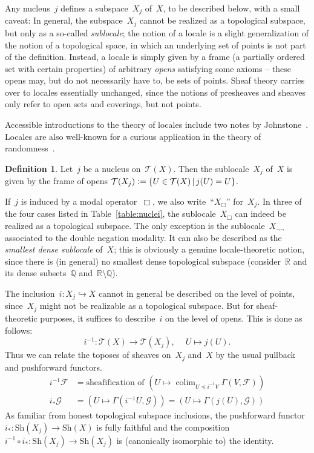 \documentclass[10pt,reqno,a4paper]{amsbook}
\theoremstyle{definition}
\newtheorem{defn}{Definition}[section]
\theoremstyle{plain}
\theoremstyle{remark}
\newcommand{\F}{\mathcal{F}}
\newcommand{\G}{\mathcal{G}}
\newcommand{\T}{\mathcal{T}}
\newcommand{\RR}{\mathbb{R}}
\newcommand{\QQ}{\mathbb{Q}}
\newcommand{\Sh}{\mathrm{Sh}}
\DeclareMathOperator*{\colim}{colim}
\newcommand{\Open}{\T}
\newcommand{\?}{\,{:}\,}
\renewcommand{\_}{\mathpunct{.}\,}
\newcommand{\lra}{\longrightarrow}
\newcommand{\defeq}{\vcentcolon=}
\begin{document}
Any nucleus~$j$ defines a subspace~$X_j$ of~$X$, to be described below, with a small caveat: In
general, the subspace~$X_j$ cannot be realized as a topological subspace, but
only as a so-called \emph{sublocale}; the notion of a locale is a slight
generalization of the notion of a topological space, in which an underlying set
of points is not part of the definition. Instead, a locale is simply given by a
frame (a partially ordered set with certain properties) of arbitrary \emph{opens} satisfying some axioms -- these opens may, but do not necessarily have to,
be sets of points. Sheaf theory carries over to locales essentially unchanged,
since the notions of presheaves and sheaves only refer to open sets and coverings,
but not points.

Accessible introductions to the theory of locales include two notes by
Johnstone~\cite{johnstone:art,johnstone:point}. Locales are also well-known for
a curious application in the theory of
randomness~\cite{simpson:random1,simpson:random2}.

\begin{defn}\label{defn:subspace-by-nucleus}Let~$j$ be a nucleus on~$\Open(X)$.
Then the sublocale~$X_j$ of~$X$ is given by the frame of opens
$\Open(X_j) \defeq \{ U \in \Open(X) \,|\, j(U) = U \}$.
\end{defn}
If~$j$ is induced by a modal operator~$\Box$, we also write~``$X_\Box$''
for~$X_j$. In three of the four cases listed in Table~\ref{table:nuclei}, the
sublocale~$X_\Box$ can indeed be realized as a topological subspace. The only
exception is the sublocale~$X_{\neg\neg}$ associated to the double negation
modality. It can also be described as the \emph{smallest dense sublocale}
of~$X$; this is obviously a genuine locale-theoretic notion, since there
is (in general) no smallest dense topological subspace
(consider~$\RR$ and its dense subsets~$\QQ$ and~$\RR \setminus \QQ$).

The inclusion~$i : X_j \hookrightarrow X$ cannot in general be described on the
level of points, since~$X_j$ might not be realizable as a topological subspace.
But for sheaf-theoretic purposes, it suffices to describe~$i$ on the level of
opens. This is done as follows:
\[ i^{-1} : \Open(X) \lra \Open(X_j),\ \quad U \longmapsto j(U). \]
Thus we can relate the toposes of sheaves on~$X_j$ and~$X$ by the usual
pullback and pushforward functors.
\begin{align*}
  i^{-1} \F &= \text{sheafification of $(U \mapsto \colim_{U \preceq i^{-1}V} \Gamma(V,\F))$} \\
  i_* \G &= (U \mapsto \Gamma(i^{-1}U, \G)) = (U \mapsto \Gamma(j(U), \G))
\end{align*}
As familiar from honest topological subspace inclusions, the pushforward
functor~$i_* : \Sh(X_j) \to \Sh(X)$ is fully faithful and the composition~$i^{-1}
\circ i_* : \Sh(X_j) \to \Sh(X_j)$ is (canonically isomorphic to) the identity.
\end{document}
